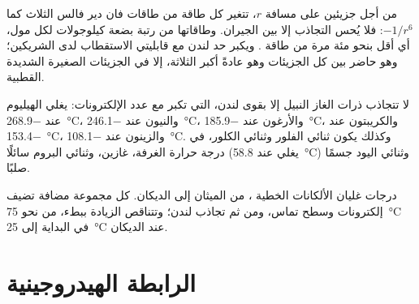 \begin{proposition}\label{prop:b1:intermolecular-forces-solvents:distance-law}
من أجل جزيئين على مسافة $r$، تتغير كل طاقة من طاقات فان دير فالس
الثلاث كما $-1/r^6$: فلا يُحس التجاذب إلا بين
الجيران. وطاقاتها من رتبة بضعة كيلوجولات لكل
مول، أي أقل بنحو مئة مرة من طاقة . ويكبر حد لندن
مع قابليتي الاستقطاب لدى الشريكين؛ وهو حاضر
بين كل الجزيئات وهو عادةً أكبر الثلاثة، إلا
في الجزيئات الصغيرة الشديدة القطبية.
\end{proposition}
\admitted

\begin{example}\label{ex:b1:intermolecular-forces-solvents:noble}
لا تتجاذب ذرات الغاز النبيل إلا بقوى لندن،
التي تكبر مع عدد الإلكترونات: يغلي الهيليوم عند
\qty{-268.9}{\celsius}، والنيون عند \qty{-246.1}{\celsius}، والأرغون عند
\qty{-185.9}{\celsius}، والكريبتون عند \qty{-153.4}{\celsius}، والزينون عند
\qty{-108.1}{\celsius}. وكذلك يكون ثنائي الفلور وثنائي الكلور، في درجة حرارة الغرفة،
غازين، وثنائي البروم سائلًا (يغلي عند \qty{58.8}{\celsius})
وثنائي اليود جسمًا صلبًا.
\end{example}

\begin{omfigure}

{\small درجات غليان الألكانات الخطية ، من الميثان إلى
الديكان. كل مجموعة  مضافة تضيف إلكترونات وسطح تماس، ومن ثم
تجاذب لندن؛ وتتناقص الزيادة ببطء، من نحو
\qty{75}{\celsius} في البداية إلى \qty{25}{\celsius} عند الديكان.}
\end{omfigure}

\section{الرابطة الهيدروجينية}

